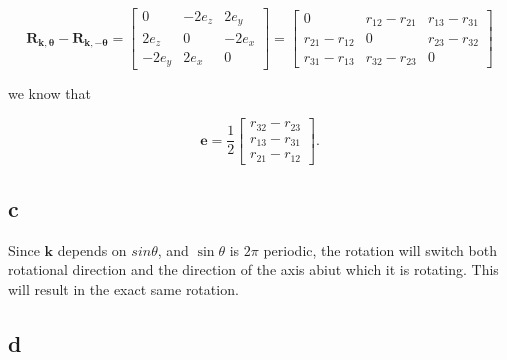 \documentclass{article}
\begin{document}
\begin{equation*}
    \mathbf{R_{\mathbf{k},\theta}} - \mathbf{R_{\mathbf{k},-\theta}} = 
    \begin{bmatrix}
        0 & -2e_z & 2e_y\\
        2e_z & 0 & -2e_x\\
        -2e_y & 2e_x & 0
    \end{bmatrix}
    = \begin{bmatrix}
        0 & r_{12}-r_{21} & r_{13} - r_{31}\\
        r_{21} - r_{12} & 0 & r_{23} - r_{32}\\
        r_{31} - r_{13} & r_{32} - r_{23} & 0
    \end{bmatrix}
\end{equation*}

we know that 

\begin{equation*}
    \mathbf{e} = \frac{1}{2}\begin{bmatrix}
        r_{32} - r_{23}\\
        r_{13} - r_{31}\\
        r_{21} - r_{12}
    \end{bmatrix}.
\end{equation*}

\subsection{c}

Since $\mathbf{k}$ depends on $sin\theta$, and $\sin\theta$ is $2\pi$ periodic, the rotation will switch both rotational direction and the direction of the axis abiut which it is rotating. This will result in the exact same rotation. 

\subsection{d}
\end{document}
